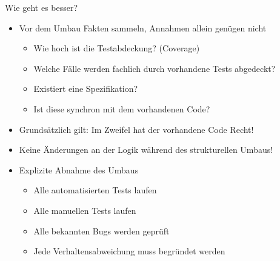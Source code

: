%
%
%

\begin{frame}[t,fragile]{Wie geht es besser?}
\begin{itemize}
\item Vor dem Umbau Fakten sammeln, Annahmen allein genügen nicht
\begin{itemize}
\item Wie hoch ist die Testabdeckung? (Coverage)
\item Welche Fälle werden fachlich durch vorhandene Tests abgedeckt?
\item Existiert eine Spezifikation?
\item Ist diese synchron mit dem vorhandenen Code?
\end{itemize}

\item Grundsätzlich gilt: Im Zweifel hat der vorhandene Code Recht!

\item Keine Änderungen an der Logik während des strukturellen Umbaus!

\item Explizite Abnahme des Umbaus
\begin{itemize}
\item Alle automatisierten Tests laufen
\item Alle manuellen Tests laufen
\item Alle bekannten Bugs werden geprüft
\item Jede Verhaltensabweichung muss begründet werden
\end{itemize}

\end{itemize}
\end{frame}



